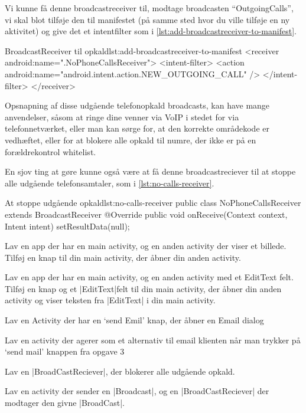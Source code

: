 Vi kunne få denne broadcastreceiver til, modtage broadcasten ``OutgoingCalls'', vi skal blot tilføje den til manifestet (på samme sted hvor du ville tilføje en ny aktivitet) og give det et intentfilter som i \autoref{lst:add-broadcastreceiver-to-manifest}.

\begin{XmlCode}{BroadcastReceiver til opkald}{lst:add-broadcastreceiver-to-manifest}
	<receiver android:name=".NoPhoneCallsReceiver">
		<intent-filter>
			<action android:name="android.intent.action.NEW_OUTGOING_CALL" />
		</intent-filter>
	</receiver>
\end{XmlCode}

Opsnapning af disse udgående telefonopkald broadcasts, kan have mange anvendelser, såsom at ringe dine venner via VoIP i stedet for via telefonnetværket, eller man kan sørge for, at den korrekte områdekode er vedhæftet, eller for at blokere alle opkald til numre, der ikke er på en forældrekontrol whitelist.

En sjov ting at gøre kunne også være at få denne broadcastreciever til at stoppe alle udgående telefonsamtaler, som i \autoref{lst:no-calls-receiver}.

\begin{JavaCode}{At stoppe udgående opkald}{lst:no-calls-receiver}
	public class NoPhoneCallsReceiver extends BroadcastReceiver {
		@Override
		public void onReceive(Context context, Intent intent) {
			setResultData(null);
		}
	}
\end{JavaCode}

\begin{exercise}
	Lav en app der har en main activity, og en anden activity der viser et billede. Tilføj en knap til din main activity, der åbner din anden activity.
\end{exercise}

\begin{exercise}
	Lav en app der har en main activity, og en anden activity med et EditText felt. Tilføj en knap og et \JavaInline|EditText|felt til din main activity, der åbner din anden activity og viser teksten fra \JavaInline|EditText| i din main activity.
\end{exercise}

\begin{exercise}
	Lav en Activity der har en ‘send Emil’ knap, der åbner en Email dialog
\end{exercise}

\begin{exercise}
	Lav en activity der agerer som et alternativ til email klienten når man trykker på ‘send mail’ knappen fra opgave 3
\end{exercise}

\begin{exercise}
	Lav en \JavaInline|BroadCastReciever|, der blokerer alle udgående opkald.
\end{exercise}

\begin{exercise}
	Lav en activity der sender en \JavaInline|Broadcast|, og en \JavaInline|BroadCastReciever| der modtager den givne \JavaInline|BroadCast|.
\end{exercise}

